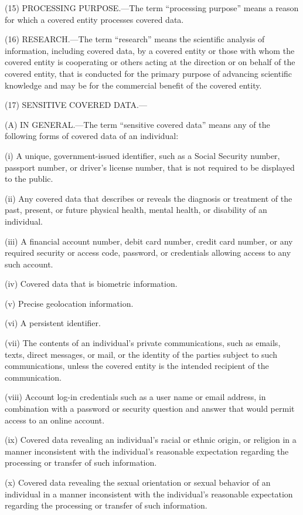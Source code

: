 (15) PROCESSING PURPOSE.—The term “processing purpose” means a reason for which a covered entity processes covered data.

(16) RESEARCH.—The term “research” means the scientific analysis of information, including covered data, by a covered entity or those with whom the covered entity is cooperating or others acting at the direction or on behalf of the covered entity, that is conducted for the primary purpose of advancing scientific knowledge and may be for the commercial benefit of the covered entity.

(17) SENSITIVE COVERED DATA.—

(A) IN GENERAL.—The term “sensitive covered data” means any of the following forms of covered data of an individual:

(i) A unique, government-issued identifier, such as a Social Security number, passport number, or driver’s license number, that is not required to be displayed to the public.

(ii) Any covered data that describes or reveals the diagnosis or treatment of the past, present, or future physical health, mental health, or disability of an individual.

(iii) A financial account number, debit card number, credit card number, or any required security or access code, password, or credentials allowing access to any such account.

(iv) Covered data that is biometric information.

(v) Precise geolocation information.

(vi) A persistent identifier.

(vii) The contents of an individual’s private communications, such as emails, texts, direct messages, or mail, or the identity of the parties subject to such communications, unless the covered entity is the intended recipient of the communication.

(viii) Account log-in credentials such as a user name or email address, in combination with a password or security question and answer that would permit access to an online account.

(ix) Covered data revealing an individual’s racial or ethnic origin, or religion in a manner inconsistent with the individual’s reasonable expectation regarding the processing or transfer of such information.

(x) Covered data revealing the sexual orientation or sexual behavior of an individual in a manner inconsistent with the individual’s reasonable expectation regarding the processing or transfer of such information.

